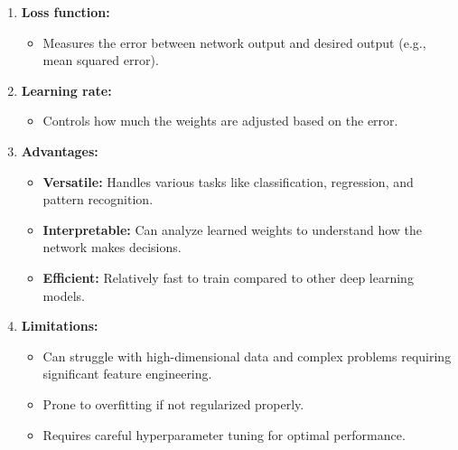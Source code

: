 \documentclass{article}
\begin{document}
\begin{flushleft}
\begin{enumerate}
            \item \textbf{Loss function:}
                \begin{itemize}
                    \item Measures the error between network output and desired output (e.g., mean squared error).
                \end{itemize}
                
			\item \textbf{Learning rate:}
                \begin{itemize}
                    \item Controls how much the weights are adjusted based on the error.
                \end{itemize}
                
            \item \textbf{Advantages:}
                \begin{itemize}
                    \item \textbf{Versatile:} Handles various tasks like classification, regression, and pattern recognition.
					\item \textbf{Interpretable:} Can analyze learned weights to understand how the network makes decisions.
					\item \textbf{Efficient:} Relatively fast to train compared to other deep learning models.
                \end{itemize}

           \item \textbf{Limitations:}
                \begin{itemize}
                    \item Can struggle with high-dimensional data and complex problems requiring significant feature engineering.
					\item Prone to overfitting if not regularized properly.
					\item Requires careful hyperparameter tuning for optimal performance.
                \end{itemize}

        \end{enumerate}


  
    \end{flushleft}
\end{document}

